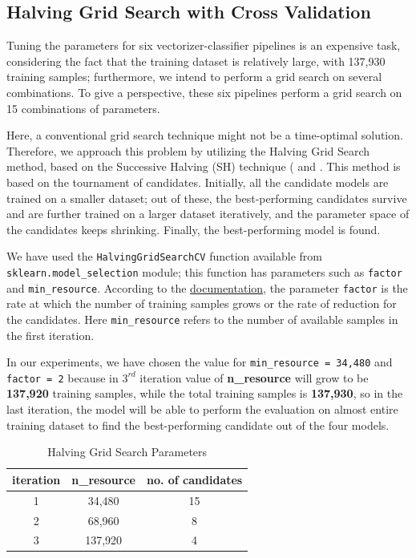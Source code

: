 \documentclass[11pt]{article}
\begin{document}
\subsection{Halving Grid Search with Cross Validation}
\label{met:halving_grid}
Tuning the parameters for six vectorizer-classifier pipelines is an expensive task, considering the fact that the training dataset is relatively large, with 137,930 training samples; furthermore, we intend to perform a grid search on several combinations. To give a perspective, these six pipelines perform a grid search on 15 combinations of parameters.

Here, a conventional grid search technique might not be a time-optimal solution. Therefore, we approach this problem by utilizing the Halving Grid Search method, based on the Successive Halving (SH) technique  (\cite{halving_gs1} and \cite{halving_gs2}. This method is based on the tournament of candidates. Initially, all the candidate models are trained on a smaller dataset; out of these, the best-performing candidates survive and are further trained on a larger dataset  iteratively, and the parameter space of the candidates keeps shrinking. Finally, the best-performing model is found.

We have used the \texttt{HalvingGridSearchCV} function available from \texttt{sklearn.model\_selection} module; this function has parameters such as \texttt{factor} and \texttt{min\_resource}. According to the \href{https://scikit-learn.org/stable/modules/grid_search.html#id4}{documentation}, the parameter \texttt{factor} is the rate at which the number of training samples grows or the rate of reduction for the candidates. Here \texttt{min\_resource} refers to the number of available samples in the first iteration.

In our experiments, we have chosen the value for \texttt{min\_resource = 34,480} and \texttt{factor = 2} because in $3^{rd}$ iteration value of \textbf{n\_resource} will grow to be \textbf{137,920} training samples, while the total training samples is \textbf{137,930}, so in the last iteration, the model will be able to perform the evaluation on almost entire training dataset to find the best-performing candidate out of the four models. 
\begin{table}
    \centering
    \scriptsize
    \begin{tabular}{c c c}
    \hline 
      \textbf{iteration}   & \textbf{n\_resource}  & \textbf{no. of candidates} \\ \hline 
        1 & 34,480 & 15\\
        2 & 68,960 & 8\\
        3 & 137,920 & 4\\\hline     
    \end{tabular}
    \caption{Halving Grid Search Parameters}
    \label{tab:my_label}
\end{table}
\end{document}
